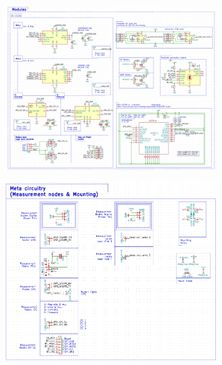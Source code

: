 \begin{figure}[h]
	\centering
    \includegraphics[width=\linewidth]{Figures/schem_r3_b.png}
	\label{fig:schr3b}
\end{figure}
\begin{figure}[h]
	\centering
    \includegraphics[width=\linewidth]{Figures/schem_r3_c.png}
	\label{fig:schr3c}
\end{figure}

\clearpage
